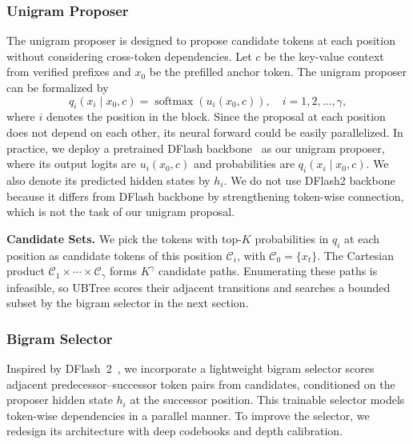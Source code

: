 \subsubsection{Unigram Proposer}
\label{sec:method-unigram}
The unigram proposer is designed to propose candidate tokens at each position without considering cross-token dependencies. Let $c$ be the key-value context from verified prefixes and $x_0$ be the prefilled anchor token. The unigram proposer can be formalized by
\begin{equation}
    q_i(x_{i}\mid x_0,c)=\operatorname{softmax}(u_i(x
    _0,c)),\quad i=1,2,...,\gamma,
    \label{eq:ubtree-unigram}
\end{equation}
where $i$ denotes the position in the block. Since the proposal at each position does not depend on each other, its neural forward could be easily parallelized. In practice, we deploy a pretrained DFlash backbone~\citep{chen2026dflash} as our unigram proposer, where its output logits are $u_i(x_0,c)$ and probabilities are $q_i(x_{i}\mid x_0,c)$. We also denote its predicted hidden states by $h_i$. We do not use DFlash2 backbone~\citep{inco2026dflash2} because it differs from DFlash backbone by strengthening token-wise connection, which is not the task of our unigram proposal.

\noindent\textbf{Candidate Sets.}
We pick the tokens with top-$K$ probabilities in $q_i$ at each position as candidate tokens of this position $\mathcal C_i$, with $\mathcal C_0=\{x_t\}$. The Cartesian product $\mathcal C_1\times\cdots\times\mathcal C_\gamma$ forms $K^\gamma$ candidate paths. Enumerating these paths is infeasible, so UBTree scores their adjacent transitions and searches a bounded subset by the bigram selector in the next section.

\subsubsection{Bigram Selector}
\label{sec:method-selector}
Inspired by DFlash~2~\citep{inco2026dflash2}, we incorporate a lightweight bigram selector scores adjacent predecessor--successor token pairs from candidates, conditioned on the proposer hidden state $h_i$ at the successor position. This trainable selector models token-wise dependencies in a parallel manner. To improve the selector, we redesign its architecture with deep codebooks and depth calibration.

